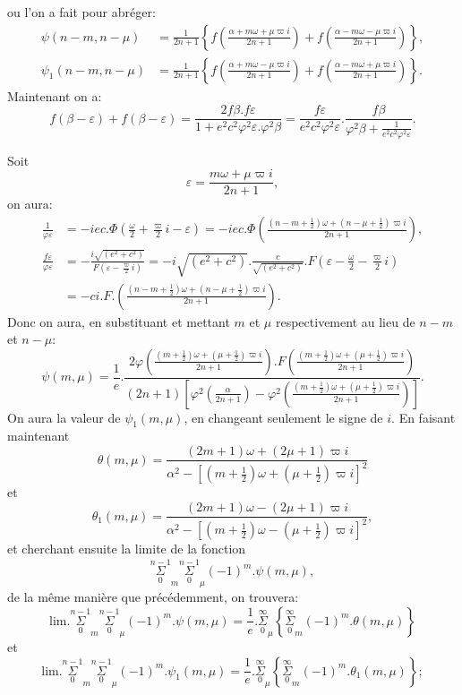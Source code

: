\documentclass{article}
\begin{document}
ou l'on a fait pour abréger:
\[ \begin{aligned}\psi(n-m,n-\mu)&=\frac{1}{2n+1}\left\{f\left(\frac{\alpha+m\omega+\mu\varpi i}{2n+1}\right)+f\left(\frac{\alpha-m\omega-\mu\varpi i}{2n+1}\right)\right\},\\ \psi_{1}(n-m,n-\mu)&=\frac{1}{2n+1}\left\{f\left(\frac{\alpha+m\omega-\mu\varpi i}{2n+1}\right)+f\left(\frac{\alpha-m\omega+\mu\varpi i}{2n+1}\right)\right\}.\end{aligned} \]
Maintenant on a:
\[ f(\beta-\varepsilon)+f(\beta-\varepsilon)=\frac{2f\beta.f\varepsilon}{1+e^{2}c^{2}\varphi^{2}\varepsilon.\varphi^{2}\beta}=\frac{f\varepsilon}{e^{2}c^{2}\varphi^{2}\varepsilon}.\frac{f\beta}{\varphi^{2}\beta+\frac{1}{e^{2}c^{2}\varphi^{2}\varepsilon}}. \]

Soit
\[ \varepsilon=\frac{m\omega+\mu\varpi i}{2n+1}, \]
on aura:
\[ \begin{aligned}\frac{1}{\varphi\varepsilon}&=-iec.\Phi\left(\frac{\omega}{2}+\frac{\varpi}{2}i-\varepsilon\right)=-iec.\Phi\left(\frac{(n-m+\tfrac{1}{2})\omega+(n-\mu+\tfrac{1}{2})\varpi i}{2n+1}\right),\\ \frac{f\varepsilon}{\varphi\varepsilon}&=-\frac{i\sqrt{(e^{2}+c^{2})}}{F\left(\varepsilon-\frac{\varpi}{2}i\right)}=-i\sqrt{(e^{2}+c^{2})}.\frac{c}{\sqrt{(e^{2}+c^{2})}}.F\left(\varepsilon-\frac{\omega}{2}-\frac{\varpi}{2}i\right)\\ &=-ci.F.\left(\frac{(n-m+\tfrac{1}{2})\omega+(n-\mu+\tfrac{1}{2})\varpi i}{2n+1}\right).\end{aligned} \]
Donc on aura, en substituant et mettant $m$ et $\mu$ respectivement au lieu de $n-m$ et $n-\mu$:
\[ \psi(m,\mu)=\frac{1}{e}.\frac{2\varphi\left(\frac{(m+\tfrac{1}{2})\omega+(\mu+\tfrac{1}{2})\varpi i}{2n+1}\right).F\left(\frac{(m+\tfrac{1}{2})\omega+(\mu+\tfrac{1}{2})\varpi i}{2n+1}\right)}{(2n+1)\left[\varphi^{2}\left(\frac{\alpha}{2n+1}\right)-\varphi^{2}\left(\frac{(m+\tfrac{1}{2})\omega+(\mu+\tfrac{1}{2})\varpi i}{2n+1}\right)\right]}. \]
On aura la valeur de $\psi_{1}(m,\mu)$, en changeant seulement le signe de $i$. En faisant maintenant
\[ \theta(m,\mu)=\frac{(2m+1)\omega+(2\mu+1)\varpi i}{\alpha^{2}-[(m+\tfrac{1}{2})\omega+(\mu+\tfrac{1}{2})\varpi i]^{2}} \]
et
\[ \theta_{1}(m,\mu)=\frac{(2m+1)\omega-(2\mu+1)\varpi i}{\alpha^{2}-[(m+\tfrac{1}{2})\omega-(\mu+\tfrac{1}{2})\varpi i]^{2}}, \]
et cherchant ensuite la limite de la fonction
\[ \overset{n-1}{\underset{0}{\Sigma}}_{m}\overset{n-1}{\underset{0}{\Sigma}}_{\mu}(-1)^{m}.\psi(m,\mu), \]
de la même manière que précédemment, on trouvera:
\[ \text{lim.}\overset{n-1}{\underset{0}{\Sigma}}_{m}\overset{n-1}{\underset{0}{\Sigma}}_{\mu}(-1)^{m}.\psi(m,\mu)=\frac{1}{e}.\overset{\infty}{\underset{0}{\Sigma}}_{\mu}\left\{\overset{\infty}{\underset{0}{\Sigma}}_{m}(-1)^{m}.\theta(m,\mu)\right\} \]
et
\[ \text{lim.}\overset{n-1}{\underset{0}{\Sigma}}_{m}\overset{n-1}{\underset{0}{\Sigma}}_{\mu}(-1)^{m}.\psi_{1}(m,\mu)=\frac{1}{e}.\overset{\infty}{\underset{0}{\Sigma}}_{\mu}\left\{\overset{\infty}{\underset{0}{\Sigma}}_{m}(-1)^{m}.\theta_{1}(m,\mu)\right\}; \]
\end{document}
